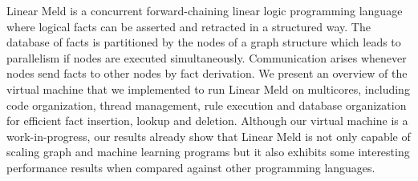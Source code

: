 Linear Meld is a concurrent forward-chaining linear logic programming language where logical facts can be asserted and
retracted in a structured way. The database of facts is partitioned by the nodes of a graph structure which leads
to parallelism if nodes are executed simultaneously. Communication arises whenever nodes send facts to other nodes
by fact derivation. We present an overview of the virtual machine that we implemented to run Linear Meld on multicores,
including code organization, thread management, rule execution and database organization for efficient fact insertion,
lookup and deletion. Although our virtual machine is a work-in-progress, our results already show that Linear Meld is not only
capable of scaling graph and machine learning programs but it also exhibits some interesting performance results when
compared against other programming languages.